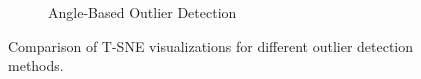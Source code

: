 \begin{figure}[htbp]
\begin{subfigure}{0.32\textwidth}
        \caption{Angle-Based Outlier Detection}
        \label{fig:ABOD}
    \end{subfigure}
    \caption{Comparison of T-SNE visualizations for different outlier detection methods.}
    \label{fig:outlier_methods}
\end{figure}

